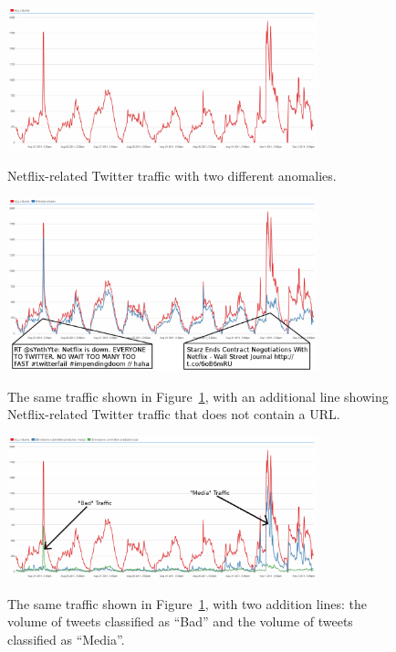 \documentclass[12pt]{ucthesis}
\newcommand{\captionfonts}{\small\bf\ssp}
\begin{document}
\begin{figure}
   \begin{center}
      \includegraphics[width=0.8\textwidth]{images/Anomalous_Traffic.eps}
      \captionfonts
      \caption[Anomalous Traffic]{Netflix-related Twitter traffic with two different anomalies.}
      \label{fig:anomalous-traffic}
   \end{center}
\end{figure}

\begin{figure}
   \begin{center}
      \includegraphics[width=0.8\textwidth]{images/Linkless_Differentiation.eps}
      \captionfonts
      \caption[Linkless Anomalous Traffic]{The same traffic shown in Figure~\ref{fig:anomalous-traffic}, with an additional line showing Netflix-related Twitter traffic that does not contain a URL.}
      \label{fig:linkless-traffic}
   \end{center}
\end{figure}

\begin{figure}
   \begin{center}
      \includegraphics[width=0.8\textwidth]{images/Classified_Traffic.eps}
      \captionfonts
      \caption[Classified Traffic]{The same traffic shown in Figure~\ref{fig:anomalous-traffic}, with two addition lines: the volume of tweets classified as ``Bad'' and the volume of tweets classified as ``Media''.}
      \label{fig:classified-traffic}
   \end{center}
\end{figure}
\end{document}
